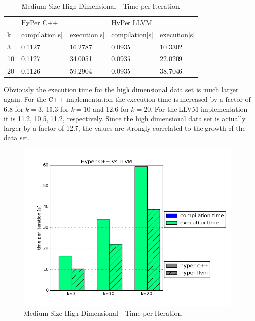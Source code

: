 \begin{table}[htsb]
  \caption[Medium Size High Dimensional - Time per Iteration]{Medium Size High Dimensional - Time per Iteration.}
  \label{tab:med_hd_serial}
  \centering
  \begin{tabular}{l l l l l}
    \toprule
      & HyPer C++ & & HyPer LLVM & \\
      k & compilation[s] & execution[s] & compilation[s] & execution[s] \\
    \midrule
      3  & 0.1127 & 16.2787 & 0.0935 & 10.3302 \\
      10 & 0.1127 & 34.0051 & 0.0935 & 22.0209 \\
      20 & 0.1126 & 59.2904 & 0.0935 & 38.7046 \\
    \bottomrule
  \end{tabular}
\end{table}

Obviously the execution time for the high dimensional data set is much larger again. For the C++ implementation the execution time is increased by a factor of 6.8 for $k = 3$, 10.3 for $k = 10$ and 12.6 for $k = 20$. For the LLVM implementation it is 11.2, 10.5, 11.2, respectively. Since the high dimensional data set is actually larger by a factor of 12.7, the values are strongly correlated to the growth of the data set.

\begin{figure}[htsb]
  \centering
  \includegraphics[scale=0.4, trim="0cm 1.5cm 0cm 0cm"]{figures/charts/hyper_15Mxhd}
  \caption[Medium Size High Dimensional - Time per Iteration]{Medium Size High Dimensional - Time per Iteration.}
  \label{fig:hyper_15Mxhd}
\end{figure}


